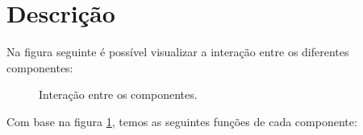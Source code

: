 \documentclass{article}
\begin{document}
\newpage


\section{Descrição}

Na figura seguinte é possível visualizar a interação entre os diferentes componentes:\\

\begin{figure}[h]
\def\svgwidth{1\textwidth\centering}

\caption{Interação entre os componentes.}
\label{fig:scheme}
\end{figure}

Com base na figura \ref{fig:scheme}, temos as seguintes funções de cada componente:
\end{document}

